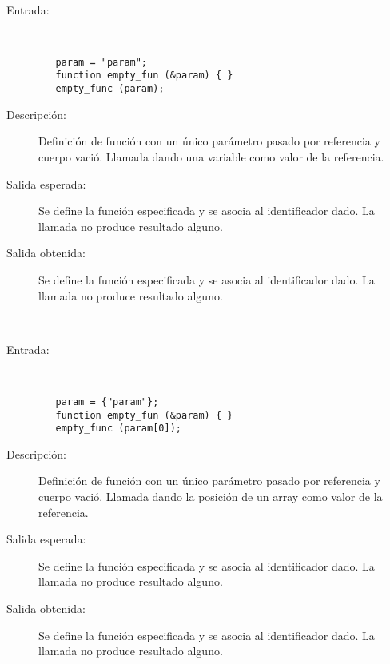 \hfil \\

	\begin{description}
		\item [Entrada:] \hfill \\
\begin{lstlisting}
   param = "param";
   function empty_fun (&param) { } 
   empty_func (param);
\end{lstlisting}
		\item [Descripción:] Definición de función con un único parámetro pasado por referencia y cuerpo vació. Llamada dando una variable como valor de la referencia.
		\item [Salida esperada:] Se define la función especificada y se asocia al identificador dado. La llamada no produce resultado alguno.
		\item [Salida obtenida:] Se define la función especificada y se asocia al identificador dado. La llamada no produce resultado alguno.
	\end{description}
\hfil \\
	\begin{description}
		\item [Entrada:] \hfill \\
\begin{lstlisting}
   param = {"param"};
   function empty_fun (&param) { } 
   empty_func (param[0]);
\end{lstlisting}
		\item [Descripción:] Definición de función con un único parámetro pasado por referencia y cuerpo vació. Llamada dando la posición de un array como valor de la referencia.
		\item [Salida esperada:] Se define la función especificada y se asocia al identificador dado. La llamada no produce resultado alguno.
		\item [Salida obtenida:] Se define la función especificada y se asocia al identificador dado. La llamada no produce resultado alguno.
	\end{description}
\hfil \\
